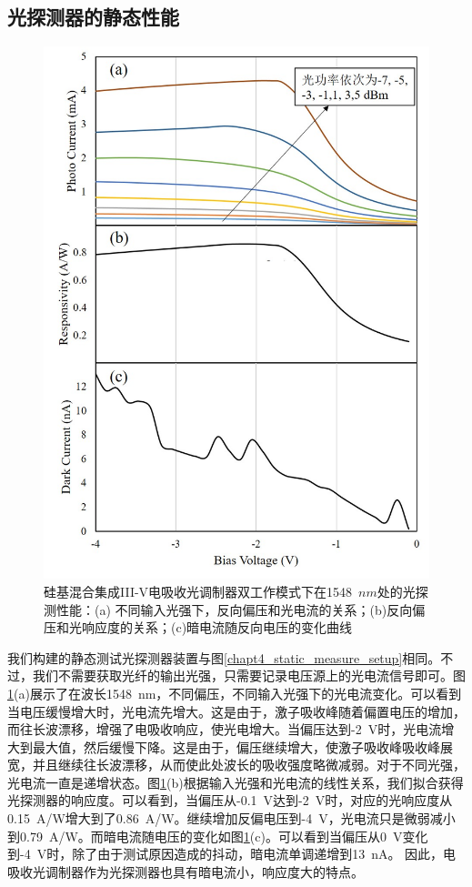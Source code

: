 \subsection{光探测器的静态性能}
\begin{figure}[htb]
	\centering
	\includegraphics[width=12cm]{./Pictures/chapt4_pd_static.jpg}
	\caption{硅基混合集成III-V电吸收光调制器双工作模式下在1548~$n m$处的光探测性能：(a) 不同输入光强下，反向偏压和光电流的关系；(b)反向偏压和光响应度的关系；(c)暗电流随反向电压的变化曲线}
	\label{chapt4_pd_static}
\end{figure}
我们构建的静态测试光探测器装置与图\ref{chapt4_static_measure_setup}相同。不过，我们不需要获取光纤的输出光强，只需要记录电压源上的光电流信号即可。图\ref{chapt4_pd_static}(a)展示了在波长1548~nm，不同偏压，不同输入光强下的光电流变化。可以看到当电压缓慢增大时，光电流先增大。这是由于，激子吸收峰随着偏置电压的增加，而往长波漂移，增强了电吸收响应，使光电增大。当偏压达到-2~V时，光电流增大到最大值，然后缓慢下降。这是由于，偏压继续增大，使激子吸收峰吸收峰展宽，并且继续往长波漂移，从而使此处波长的吸收强度略微减弱。对于不同光强，光电流一直是递增状态。图\ref{chapt4_pd_static}(b)根据输入光强和光电流的线性关系，我们拟合获得光探测器的响应度。可以看到，当偏压从-0.1~V达到-2~V时，对应的光响应度从0.15~A/W增大到了0.86~A/W。继续增加反偏电压到-4~V，光电流只是微弱减小到0.79~A/W。而暗电流随电压的变化如图\ref{chapt4_pd_static}(c)。可以看到当偏压从0~V变化到-4~V时，除了由于测试原因造成的抖动，暗电流单调递增到13~nA。 因此，电吸收光调制器作为光探测器也具有暗电流小，响应度大的特点。

